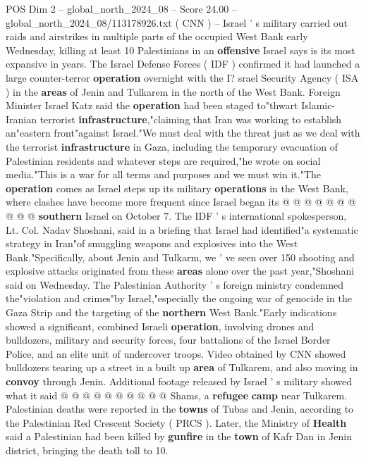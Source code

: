 \begin{textsample}{POS Dim 2 – global\_north\_2024\_08 – Score 24.00 – global\_north\_2024\_08/113178926.txt}  \label{ex:f2_pos_400}
( CNN ) -- Israel ' s military carried out raids and airstrikes in multiple parts of the occupied West Bank early Wednesday, killing at least 10 Palestinians in an \textbf{offensive} Israel says is its most expansive in years.
The Israel Defense Forces ( IDF ) confirmed it had launched a large counter-terror \textbf{operation} overnight with the I? srael Security Agency ( ISA ) in the \textbf{areas} of Jenin and Tulkarem in the north of the West Bank.
Foreign Minister Israel Katz said the \textbf{operation} had been staged to"thwart Islamic-Iranian terrorist \textbf{infrastructure},"claiming that Iran was working to establish an"eastern front"against Israel."We must deal with the threat just as we deal with the terrorist \textbf{infrastructure} in Gaza, including the temporary evacuation of Palestinian residents and whatever steps are required,"he wrote on social media."This is a war for all terms and purposes and we must win it."The \textbf{operation} comes as Israel steps up its military \textbf{operations} in the West Bank, where clashes have become more frequent since Israel began its @ @ @ @ @ @ @ @ @ @ \textbf{southern} Israel on October 7.
The IDF ' s international spokesperson, Lt.
Col.
Nadav Shoshani, said in a briefing that Israel had identified"a systematic strategy in Iran"of smuggling weapons and explosives into the West Bank."Specifically, about Jenin and Tulkarm, we ' ve seen over 150 shooting and explosive attacks originated from these \textbf{areas} alone over the past year,"Shoshani said on Wednesday.
The Palestinian Authority ' s foreign ministry condemned the"violation and crimes"by Israel,"especially the ongoing war of genocide in the Gaza Strip and the targeting of the \textbf{northern} West Bank."Early indications showed a significant, combined Israeli \textbf{operation}, involving drones and bulldozers, military and security forces, four battalions of the Israel Border Police, and an elite unit of undercover troops.
Video obtained by CNN showed bulldozers tearing up a street in a built up \textbf{area} of Tulkarem, and also moving in \textbf{convoy} through Jenin.
Additional footage released by Israel ' s military showed what it said @ @ @ @ @ @ @ @ @ @ Shams, a \textbf{refugee} \textbf{camp} near Tulkarem.
Palestinian deaths were reported in the \textbf{towns} of Tubas and Jenin, according to the Palestinian Red Crescent Society ( PRCS ).
Later, the Ministry of \textbf{Health} said a Palestinian had been killed by \textbf{gunfire} in the \textbf{town} of Kafr Dan in Jenin district, bringing the death toll to 10.

\end{textsample}
